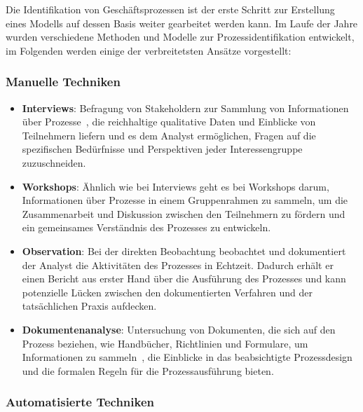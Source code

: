 Die Identifikation von Geschäftsprozessen ist der erste Schritt zur Erstellung eines Modells auf dessen Basis weiter gearbeitet werden kann.
Im Laufe der Jahre wurden verschiedene Methoden und Modelle zur Prozessidentifikation entwickelt, im Folgenden werden einige der verbreitetsten Ansätze vorgestellt:

\subsubsection{Manuelle Techniken}\label{subsubsec:discovery-manuelle-techniken}

\begin{itemize}
   \item \textbf{Interviews}: Befragung von Stakeholdern zur Sammlung von Informationen über Prozesse~\cite{Kvale2009}, die reichhaltige qualitative Daten und Einblicke von Teilnehmern liefern und es dem Analyst ermöglichen, Fragen auf die spezifischen Bedürfnisse und Perspektiven jeder Interessengruppe zuzuschneiden. 
   \item \textbf{Workshops}: Ähnlich wie bei Interviews geht es bei Workshops darum, Informationen über Prozesse in einem Gruppenrahmen zu sammeln, um die Zusammenarbeit und Diskussion zwischen den Teilnehmern zu fördern und ein gemeinsames Verständnis des Prozesses zu entwickeln.
   \item \textbf{Observation}: Bei der direkten Beobachtung beobachtet und dokumentiert der Analyst die Aktivitäten des Prozesses in Echtzeit. Dadurch erhält er einen Bericht aus erster Hand über die Ausführung des Prozesses und kann potenzielle Lücken zwischen den dokumentierten Verfahren und der tatsächlichen Praxis aufdecken.
   \item \textbf{Dokumentenanalyse}: Untersuchung von Dokumenten, die sich auf den Prozess beziehen, wie Handbücher, Richtlinien und Formulare, um Informationen zu sammeln~\cite{Seidman2006}, die Einblicke in das beabsichtigte Prozessdesign und die formalen Regeln für die Prozessausführung bieten.
 \end{itemize}

\subsubsection{Automatisierte Techniken}

